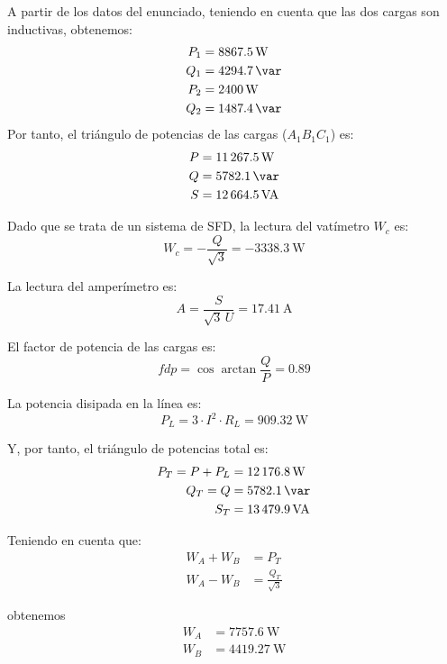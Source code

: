 A partir de los datos del enunciado, teniendo en cuenta que las dos
cargas son inductivas, obtenemos:
\begin{align*}
  P_1 &= \SI{8867.5}{\watt}\\
  Q_1 &= \SI{4294.7}{\var}\\
  P_2 &= \SI{2400}{\watt}\\
  Q_2 &= \SI{1487.4}{\var}\\
\end{align*}
Por tanto, el triángulo de potencias de las cargas ($A_1B_1C_1$) es:
\begin{align*}
  P &= \SI{11267.5}{\watt}\\
  Q &= \SI{5782.1}{\var}\\
  S &= \SI{12664.5}{VA}\\
\end{align*}

Dado que se trata de un sistema de SFD, la lectura del vatímetro $W_c$
es:
\begin{equation*}
  W_c = - \frac{Q}{\sqrt{3}} = \SI{-3338.3}{\watt}
\end{equation*}

La lectura del amperímetro es:
\begin{equation*}
  A = \frac{S}{\sqrt{3} \,U} = \SI{17.41}{\ampere}
\end{equation*}

El factor de potencia de las cargas es:
\begin{equation*}
  fdp = \cos{\arctan{\frac{Q}{P}}} = 0.89
\end{equation*}

La potencia disipada en la línea es:
\begin{equation*}
  P_L = 3 \cdot I^2 \cdot R_L = \SI{909.32}{\watt}
\end{equation*}

Y, por tanto, el triángulo de potencias total es:
\begin{align*}
  P_T = P + P_L &= \SI{12176.8}{\watt}\\
  Q_T = Q &= \SI{5782.1}{\var}\\
  S_T &= \SI{13479.9}{VA}
\end{align*}

Teniendo en cuenta que:
\begin{align*}
  W_A + W_B &= P_T\\
  W_A - W_B &= \frac{Q_T}{\sqrt{3}}
\end{align*}

obtenemos
\begin{align*}
  W_A &= \SI{7757.6}{\watt}\\
  W_B &= \SI{4419.27}{\watt}
\end{align*}

